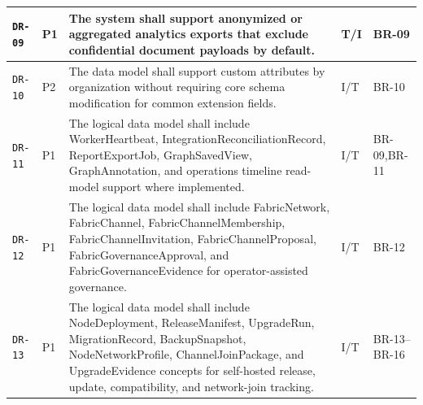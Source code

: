 \documentclass[11pt,a4paper]{article}
\begin{document}
\begin{footnotesize}
\begin{longtable}{@{}p{}p{}p{}p{}p{}@{}}
\texttt{DR-09} & P1 & The system shall support anonymized or aggregated analytics exports that exclude confidential document payloads by default. & T/I & BR-09 \\ \hline
\texttt{DR-10} & P2 & The data model shall support custom attributes by organization without requiring core schema modification for common extension fields. & I/T & BR-10 \\ \hline
\texttt{DR-11} & P1 & The logical data model shall include WorkerHeartbeat, IntegrationReconciliationRecord, ReportExportJob, GraphSavedView, GraphAnnotation, and operations timeline read-model support where implemented. & I/T & BR-09,BR-11 \\ \hline
\texttt{DR-12} & P1 & The logical data model shall include FabricNetwork, FabricChannel, FabricChannelMembership, FabricChannelInvitation, FabricChannelProposal, FabricGovernanceApproval, and FabricGovernanceEvidence for operator-assisted governance. & I/T & BR-12 \\ \hline
\texttt{DR-13} & P1 & The logical data model shall include NodeDeployment, ReleaseManifest, UpgradeRun, MigrationRecord, BackupSnapshot, NodeNetworkProfile, ChannelJoinPackage, and UpgradeEvidence concepts for self-hosted release, update, compatibility, and network-join tracking. & I/T & BR-13--BR-16 \\ \hline
\end{longtable}
\end{footnotesize}
\end{document}
